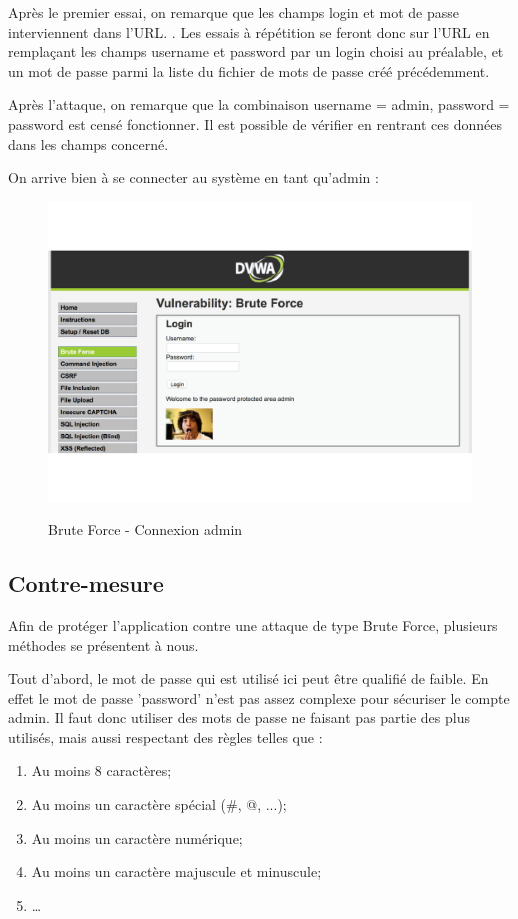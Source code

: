 Après le premier essai, on remarque que les champs login et mot de passe interviennent dans l'URL. . Les essais à répétition se feront donc sur l'URL en remplaçant les champs username et password par un login choisi au préalable, et un mot de passe parmi la liste du fichier de mots de passe créé précédemment.

Après l'attaque, on remarque que la combinaison username = admin, password = password est censé fonctionner. Il est possible de vérifier en rentrant ces données dans les champs concerné.


On arrive bien à se connecter au système en tant qu'admin :

\begin{figure}[!h]
\begin{center}

\label{inclusion}
\includegraphics[scale=0.5]{images/BruteForce-ConnexionAdmin.pdf}

\caption{Brute Force - Connexion admin}

\end{center}
\end{figure}

\subsection{Contre-mesure}

Afin de protéger l'application contre une attaque de type Brute Force, plusieurs méthodes se présentent à nous.

Tout d'abord, le mot de passe qui est utilisé ici peut être qualifié de faible. En effet le mot de passe 'password' n'est pas assez complexe pour sécuriser le compte admin. Il faut donc utiliser des mots de passe ne faisant pas partie des plus utilisés, mais aussi respectant des règles telles que :
\begin{enumerate}
\item Au moins 8 caractères;
\item Au moins un caractère spécial (\#, @, ...);
\item Au moins un caractère numérique;
\item Au moins un caractère majuscule et minuscule;
\item …
\end{enumerate}

